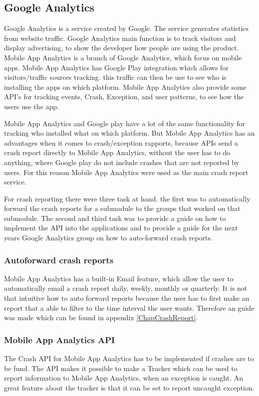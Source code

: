 \subsection{Google Analytics}\label{Sprint1_SubsecGoogleAnalytics}
Google Analytics is a service created by Google. The service generates statistics from website traffic. Google Analytics main function is to track visitors and display advertising, to show the developer how people are using the product. Mobile App Analytics is a branch of Google Analytics, which focus on mobile apps. Mobile App Analytics has Google Play integration which allows for visitors/traffic sources tracking. this traffic can then be use to see who is installing the apps on which platform. Mobile App Analytics also provide some API’s for tracking events, Crash, Exception, and user patterns, to see how the users use the app.

Mobile App Analytics and Google play have a lot of the same functionality for tracking who installed what on which platform. But Mobile App Analytics has an advantages when it comes to crash/exception rapports, because APIs send a crash report directly to Mobile App Analytics, without the user has to do anything, where Google play do not include crashes that are not reported by users. For this reason Mobile App Analytics were used as the main crash report service.

For crash reporting there were three task at hand. the first was to automatically forward the crash reports for a submodule to the groups that worked on that submodule. The second and third task was to provide a guide on how to implement the API into the applications and to provide a guide for the next years Google Analytics group on how to auto-forward crash reports.

\subsubsection{Autoforward crash reports}
Mobile App Analytics has a built-in Email feature, which allow the user to automatically email a crash report daily, weekly, monthly or quarterly. It is not that intuitive how to auto forward reports because the user has to first make an report that a able to filter to the time interval the user wants. Therefore an guide was made which can be found in appendix \ref{ChapCrashReport}.

\subsubsection{Mobile App Analytics API}
The Crash API for Mobile App Analytics has to be implemented if crashes are to be fund. The API makes it possible to make a Tracker which can be used to report information to Mobile App Analytics, when an exception is caught. An great feature about the tracker is that it can be set to report uncaught exception.